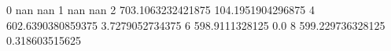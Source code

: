 0 nan nan
1 nan nan
2 703.1063232421875 104.1951904296875
4 602.6390380859375 3.7279052734375
6 598.9111328125 0.0
8 599.229736328125 0.318603515625

